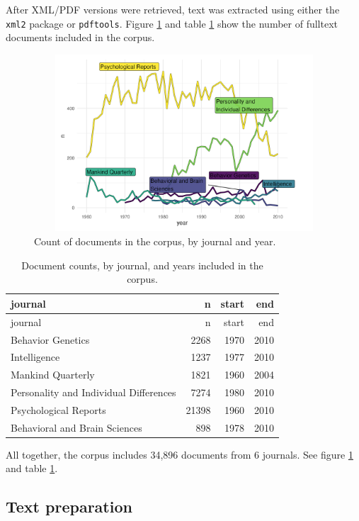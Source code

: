 \documentclass[12pt]{article}
\begin{document}
After XML/PDF versions were retrieved, text was extracted using either the \texttt{xml2} package \cite{WickhamXml2ParseXML2023} or \texttt{pdftools}. Figure \ref{fig:counts} and table \ref{tab:counts} show the number of fulltext documents included in the corpus.

\begin{figure}
\centering
\includegraphics[width=4.76in,height=2.6in]{img/02_count.png}
\caption{Count of documents in the corpus, by journal and year. \label{fig:counts}}
\end{figure}

\begin{longtable}[]{@{}lrrr@{}}
\caption{\label{tab:counts} Document counts, by journal, and years included in the corpus.}\tabularnewline
\toprule
journal & n & start & end \\
\midrule
\endfirsthead
\toprule
journal & n & start & end \\
\midrule
\endhead
Behavior Genetics & 2268 & 1970 & 2010 \\
Intelligence & 1237 & 1977 & 2010 \\
Mankind Quarterly & 1821 & 1960 & 2004 \\
Personality and Individual Differences & 7274 & 1980 & 2010 \\
Psychological Reports & 21398 & 1960 & 2010 \\
Behavioral and Brain Sciences & 898 & 1978 & 2010 \\
\bottomrule
\end{longtable}

All together, the corpus includes 34,896 documents from 6 journals. See figure \ref{fig:counts} and table \ref{tab:counts}.

\hypertarget{text-preparation}{%
\subsection{Text preparation}\label{text-preparation}}
\end{document}
